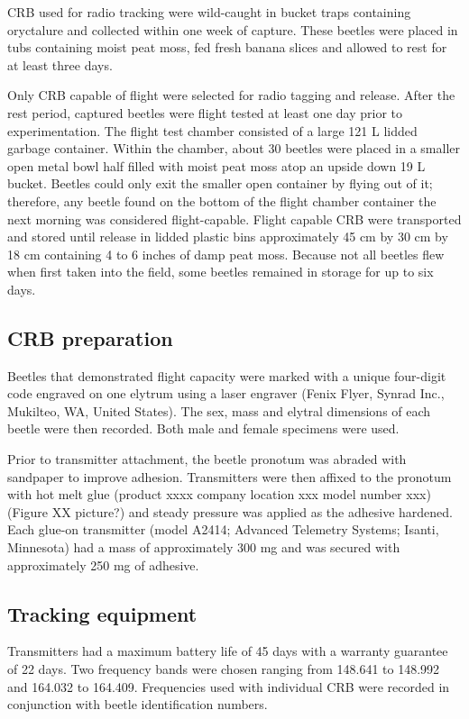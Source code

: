 \documentclass[11pt,letterpaper]{scrartcl}
\begin{document}
CRB used for radio tracking were wild-caught in bucket traps containing oryctalure and collected within one week of capture. These beetles were placed in tubs containing moist peat moss, fed fresh banana slices and allowed to rest for at least three days.

Only CRB capable of flight were selected for radio tagging and release. After the rest period, captured beetles were flight tested at least one day prior to experimentation. The flight test chamber consisted of a large 121 L lidded garbage container. Within the chamber, about 30 beetles were placed in a smaller open metal bowl half filled with moist peat moss atop an upside down 19 L bucket. Beetles could only exit the smaller open container by flying out of it; therefore, any beetle found on the bottom of the flight chamber container the next morning was considered flight-capable. Flight capable CRB were transported and stored until release in lidded plastic bins approximately 45 cm by 30 cm by 18 cm containing 4 to 6 inches of damp peat moss. Because not all beetles flew when first taken into the field, some beetles remained in storage for up to six days.

\subsection*{CRB preparation}

Beetles that demonstrated flight capacity were marked with a unique four-digit code engraved on one elytrum using a laser engraver (Fenix Flyer, Synrad Inc., Mukilteo, WA, United States). The sex, mass and elytral dimensions of each beetle were then recorded. Both male and female specimens were used.

Prior to transmitter attachment, the beetle pronotum was abraded with sandpaper to improve adhesion. Transmitters were then affixed to the pronotum with hot melt glue (product xxxx company location xxx model number xxx)(Figure XX picture?) and steady pressure was applied as the adhesive hardened. Each glue-on transmitter (model A2414; Advanced Telemetry Systems; Isanti, Minnesota) had a mass of approximately 300 mg and was secured with approximately 250 mg of adhesive.

\subsection*{Tracking equipment}

Transmitters had a maximum battery life of 45 days with a warranty guarantee of 22 days. Two frequency bands were chosen ranging from 148.641 to 148.992 and 164.032 to 164.409. Frequencies used with individual CRB were recorded in conjunction with beetle identification numbers. 
\end{document}
